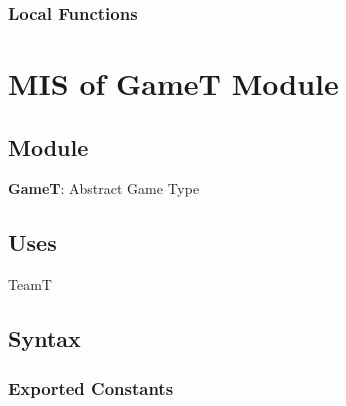 \documentclass[12pt, titlepage]{article}
\begin{document}
\begin{itemize}
\subsubsection{Local Functions}

\newpage

\section{MIS of GameT Module} \label{GameTModule}

\subsection{Module}
\textbf{GameT}: Abstract Game Type

\subsection{Uses}
TeamT

\subsection{Syntax}

\subsubsection{Exported Constants}


\end{itemize}
\end{document}
